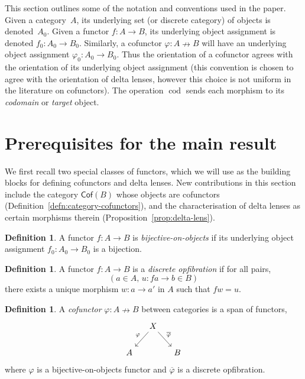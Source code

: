 \documentclass[colorlinks = true, a4paper, oneside, reqno, 11pt]{amsart}
\theoremstyle{definition}
\newtheorem{definition}[theorem]{Definition}
\theoremstyle{remark}
\newcommand{\Cof}{\mathsf{Cof}}
\newcommand{\phibar}{\overline{\varphi}}
\DeclareMathOperator{\cod}{cod}
\begin{document}
This section outlines some of the notation and conventions used in the 
paper. 
Given a category~$A$, its underlying set (or discrete category) of 
objects is denoted~$A_{0}$. 
Given a functor $f \colon A \rightarrow B$, its underlying object 
assignment is denoted $f_{0} \colon A_{0} \rightarrow B_{0}$. 
Similarly, a cofunctor $\varphi \colon A \nrightarrow B$ will have 
an underlying object assignment $\varphi_{0} \colon A_{0} \rightarrow B_{0}$. 
Thus the orientation of a cofunctor agrees with the orientation of its
underlying object assignment (this convention is chosen to agree 
with the orientation of delta lenses, however this choice is not uniform 
in the literature on cofunctors). 
The operation $\cod$ sends each morphism to its \emph{codomain} or 
\emph{target} object.

\section{Prerequisites for the main result}
\label{sec:background}

We first recall two special classes of functors, which 
we will use as the building blocks for defining cofunctors and 
delta lenses. 
New contributions in this section include the category $\Cof(B)$ 
whose objects are cofunctors (Definition~\ref{defn:category-cofunctors}), 
and the characterisation of delta lenses as certain morphisms therein
(Proposition~\ref{prop:delta-lens}). 

\begin{definition}\label{defn:bijective-on-objects}
A functor $f \colon A \rightarrow B$ is \emph{bijective-on-objects} if its 
underlying object assignment $f_{0} \colon A_{0} \rightarrow B_{0}$ is a bijection. 
\end{definition}

\begin{definition}\label{defn:discrete-opfibration}
A functor $f \colon A \rightarrow B$ is a \emph{discrete opfibration} if for all pairs,
\[
	(a \in A, \, u \colon fa \rightarrow b \in B)
\]
there exists a unique morphism 
$w \colon a \rightarrow a'$ in $A$ such that $fw = u$. 
\end{definition}

\begin{definition}\label{defn:cofunctor}
A \emph{cofunctor} $\varphi \colon A \nrightarrow B$ between categories is a 
span of functors, 
\begin{equation}
\begin{tikzcd}[column sep = small]
& X 
\arrow[ld, "\varphi"']
\arrow[rd, "\phibar"]
& 
\\
A & & B
\end{tikzcd}
\end{equation}
where $\varphi$ is a bijective-on-objects functor and $\phibar$ is a discrete opfibration. 
\end{definition}
\end{document}
